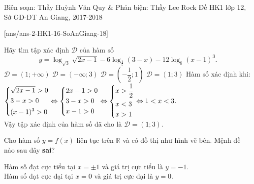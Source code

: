 \begin{name}
{Biên soạn: Thầy Huỳnh Văn Quy \& Phản biện: Thầy Lee Rock}
{Đề HK1 lớp 12, Sở GD-ĐT An Giang, 2017-2018}
\end{name}
\setcounter{ex}{0}\setcounter{bt}{0}
[ans/ans-2-HK1-16-SoAnGiang-18]


\begin{ex}%
 Hãy tìm tập xác định $\mathscr{D}$ của hàm số $$y = \log_{\sqrt{3}} \sqrt{2x-1} - 6\log_{\frac{1}{5}} (3-x) - 12 \log_{8} (x-1)^3.$$
 \choice
  {$\mathscr{D} = (1;+\infty)$}
  {$\mathscr{D} = (-\infty;3)$}
  {$\mathscr{D} = \left(-\dfrac{1}{2};1\right)$}
  {\True $\mathscr{D} = (1;3)$}
 \loigiai
  {
  Hàm số xác định khi: $\left\{\begin{aligned}& \sqrt{2x-1}>0 \\& 3-x >0 \\& (x-1)^3>0\end{aligned}\right. \Leftrightarrow \left\{\begin{aligned}& 2x-1 >0 \\& 3-x>0 \\& x-1>0\end{aligned}\right. \Leftrightarrow \left\{\begin{aligned}& x>\dfrac{1}{2} \\& x<3 \\& x>1\end{aligned}\right. \Leftrightarrow 1<x<3$.\\
  Vậy tập xác định của hàm số đã cho là $\mathscr{D} = (1;3)$.
  }
\end{ex}


\begin{ex}%
 Cho hàm số $y = f(x)$ liên tục trên $\mathbb{R}$ và có đồ thị như hình vẽ bên. Mệnh đề nào sau đây \textbf{sai}?
  {
  }
 \loigiai
  {
  Hàm số đạt cực tiểu tại $x = \pm 1$ và giá trị cực tiểu là $y = -1$.\\
  Hàm số đạt cực đại tại $x = 0$ và giá trị cực đại là $y = 0$.
  }
\end{ex}


